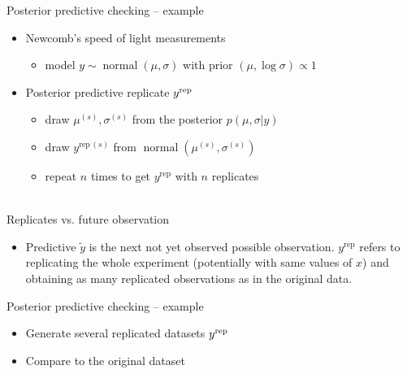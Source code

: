 \documentclass[t]{beamer}
\DeclareMathOperator{\normal}{normal}
\begin{document}
\begin{frame}{Posterior predictive checking -- example}

  \begin{itemize}
  \item<1-> Newcomb's speed of light measurements 
    \begin{itemize}
    \item model $y\sim\normal(\mu,\sigma)$ with prior $(\mu,\log\sigma)\propto 1$
    \end{itemize}
  \item<2-> Posterior predictive replicate $y^{\rm rep}$
    \begin{itemize}
    \item<3-> draw $\mu^{(s)},\sigma^{(s)}$ from the posterior $p(\mu,\sigma|y)$
    \item<4-> draw $y^{\mathrm{rep}\,(s)}$ from $\normal(\mu^{(s)},\sigma^{(s)})$
    \item<5-> repeat $n$ times to get $y^{\mathrm{rep}}$ with $n$ replicates\\~\\
      \end{itemize}
    \end{itemize}

\end{frame}

\begin{frame}{Replicates vs. future observation}

  \begin{itemize}
  \item Predictive $\tilde{y}$ is the next not yet observed possible
    observation. $y^{\mathrm{rep}}$ refers to replicating the whole
    experiment (potentially with same values of $x$) and obtaining as
    many replicated observations as in the original data.
  \end{itemize}

\end{frame}

\begin{frame}{Posterior predictive checking -- example}

  \begin{itemize}
  \item<1-> Generate several replicated datasets $y^{\rm rep}$
  \item<2-> Compare to the original dataset
  \end{itemize}
  \vspace{-1\baselineskip}

\end{frame}
\end{document}
